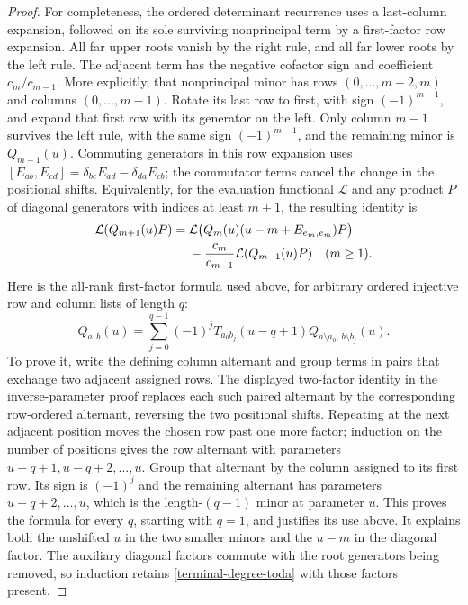 \begin{proof}
For completeness, the ordered determinant recurrence uses a
last-column expansion, followed on its sole surviving nonprincipal
term by a first-factor row expansion.  All far upper roots vanish
by the right rule, and all far lower roots by the left rule.
The adjacent term has the negative cofactor sign and coefficient
$c_m/c_{m-1}$.  More explicitly, that nonprincipal minor has rows
$(0,\ldots,m-2,m)$ and columns $(0,\ldots,m-1)$.
Rotate its last row to first, with sign $(-1)^{m-1}$, and expand
that first row with its generator on the left.  Only column
$m-1$ survives the left rule, with the same sign $(-1)^{m-1}$,
and the remaining minor is $Q_{m-1}(u)$.  Commuting generators
in this row expansion uses
$[E_{ab},E_{cd}]=\delta_{bc}E_{ad}-\delta_{da}E_{cb}$;
the commutator terms cancel the change in the positional shifts.
Equivalently, for the evaluation functional $\mathcal L$ and
any product $P$ of diagonal generators with indices at least
$m+1$, the resulting identity is
\begin{align}\label{terminal-degree-toda}
 \mathcal L(Q_{m+1}(u)P)
   ={}&\mathcal L\bigl(Q_m(u)(u-m+E_{e_m,e_m})P\bigr)\notag\\
    &-\frac{c_m}{c_{m-1}}\mathcal L(Q_{m-1}(u)P)
                                                     \quad(m\ge1).
\end{align}
Here is the all-rank first-factor formula used above, for arbitrary
ordered injective row and column lists of length $q$:
\[
 Q_{a,b}(u)=\sum_{j=0}^{q-1}(-1)^j
 T_{a_0b_j}(u-q+1)
 Q_{a\setminus a_0,\,b\setminus b_j}(u).
\]
To prove it, write the defining column alternant and group terms
in pairs that exchange two adjacent assigned rows.  The displayed
two-factor identity in the inverse-parameter proof replaces each
such paired alternant by the corresponding row-ordered alternant,
reversing the two positional shifts.  Repeating at the next
adjacent position moves the chosen row past one more factor;
induction on the number of positions gives the row alternant with
parameters $u-q+1,u-q+2,\ldots,u$.  Group that alternant by the
column assigned to its first row.  Its sign is $(-1)^j$ and the
remaining alternant has parameters $u-q+2,\ldots,u$, which is
the length-$(q-1)$ minor at parameter $u$.  This proves the formula
for every $q$, starting with $q=1$, and justifies its use above.
It explains both
the unshifted $u$ in the two smaller minors and the $u-m$ in
the diagonal factor.  The auxiliary diagonal factors commute
with the root generators being removed, so induction retains
\eqref{terminal-degree-toda} with those factors present.


\end{proof}
